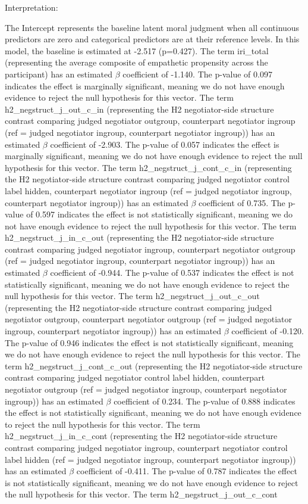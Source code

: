 \documentclass[11pt]{article}
\begin{document}
Interpretation:

The Intercept represents the baseline latent moral judgment when all continuous predictors are zero and categorical predictors are at their reference levels. In this model, the baseline is estimated at -2.517 (p=0.427). The term iri\_total (representing the average composite of empathetic propensity across the participant) has an estimated $\beta$ coefficient of -1.140. The p-value of 0.097 indicates the effect is marginally significant, meaning we do not have enough evidence to reject the null hypothesis for this vector. The term h2\_negstruct\_j\_out\_c\_in (representing the H2 negotiator-side structure contrast comparing judged negotiator outgroup, counterpart negotiator ingroup (ref = judged negotiator ingroup, counterpart negotiator ingroup)) has an estimated $\beta$ coefficient of -2.903. The p-value of 0.057 indicates the effect is marginally significant, meaning we do not have enough evidence to reject the null hypothesis for this vector. The term h2\_negstruct\_j\_cont\_c\_in (representing the H2 negotiator-side structure contrast comparing judged negotiator control label hidden, counterpart negotiator ingroup (ref = judged negotiator ingroup, counterpart negotiator ingroup)) has an estimated $\beta$ coefficient of 0.735. The p-value of 0.597 indicates the effect is not statistically significant, meaning we do not have enough evidence to reject the null hypothesis for this vector. The term h2\_negstruct\_j\_in\_c\_out (representing the H2 negotiator-side structure contrast comparing judged negotiator ingroup, counterpart negotiator outgroup (ref = judged negotiator ingroup, counterpart negotiator ingroup)) has an estimated $\beta$ coefficient of -0.944. The p-value of 0.537 indicates the effect is not statistically significant, meaning we do not have enough evidence to reject the null hypothesis for this vector. The term h2\_negstruct\_j\_out\_c\_out (representing the H2 negotiator-side structure contrast comparing judged negotiator outgroup, counterpart negotiator outgroup (ref = judged negotiator ingroup, counterpart negotiator ingroup)) has an estimated $\beta$ coefficient of -0.120. The p-value of 0.946 indicates the effect is not statistically significant, meaning we do not have enough evidence to reject the null hypothesis for this vector. The term h2\_negstruct\_j\_cont\_c\_out (representing the H2 negotiator-side structure contrast comparing judged negotiator control label hidden, counterpart negotiator outgroup (ref = judged negotiator ingroup, counterpart negotiator ingroup)) has an estimated $\beta$ coefficient of 0.234. The p-value of 0.888 indicates the effect is not statistically significant, meaning we do not have enough evidence to reject the null hypothesis for this vector. The term h2\_negstruct\_j\_in\_c\_cont (representing the H2 negotiator-side structure contrast comparing judged negotiator ingroup, counterpart negotiator control label hidden (ref = judged negotiator ingroup, counterpart negotiator ingroup)) has an estimated $\beta$ coefficient of -0.411. The p-value of 0.787 indicates the effect is not statistically significant, meaning we do not have enough evidence to reject the null hypothesis for this vector. The term h2\_negstruct\_j\_out\_c\_cont 
\end{document}
